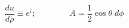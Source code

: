 \begin{equation}
\frac{d u}{d\rho}\equiv e^{l}; \qquad \qquad A= \frac{1}{2} \cos \theta \; d \phi
\end{equation}

